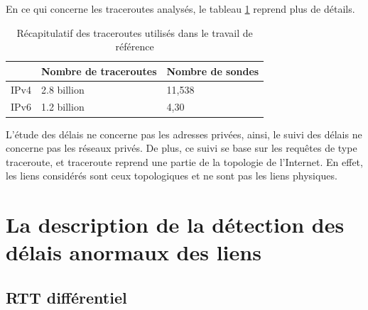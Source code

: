 En ce qui concerne les traceroutes analysés, le tableau \ref{tab:dataset} reprend plus de détails.

\begin{table}[H]
	\centering
	\begin{tabular}{|l|l|l|}
		\hline
		& \textbf{Nombre de traceroute}s& \textbf{Nombre de sondes}\\ \hline
		IPv4		&2.8 billion & 11,538\\ \hline
		IPv6	&	1.2 billion & 4,30 \\ \hline
	\end{tabular}
	\caption{Récapitulatif des traceroutes utilisés dans le travail de référence }
	\label{tab:dataset}
\end{table}


L'étude des délais ne concerne pas  les adresses privées, ainsi, le suivi des délais ne concerne pas les réseaux privés.  De plus, ce  suivi  se base sur les requêtes de type traceroute, et traceroute reprend une partie de la topologie de l'Internet. En effet, les liens considérés sont ceux topologiques et ne sont pas  les liens physiques. 










\section{La description de la détection des délais anormaux des liens}


\subsection{RTT différentiel }~

